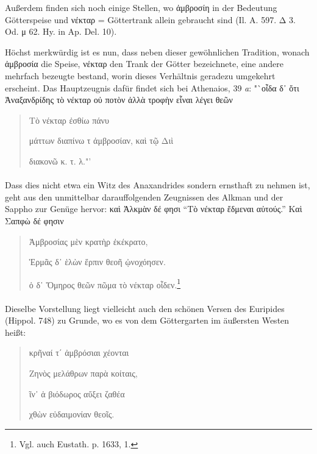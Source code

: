 \documentclass[a4paper, 11pt, oneside]{article}
\begin{document}
Außerdem finden sich noch einige Stellen, wo ἀμβροσίη in der Bedeutung Götterspeise und νέκταρ = Göttertrank allein gebraucht sind (Il. Α. 597. Δ 3. Od. μ 62. Hy. in Ap. Del. 10).

Höchst merkwürdig ist es nun, dass neben dieser gewöhnlichen Tradition, wonach ἀμβροσία die Speise, νέκταρ den Trank der Götter bezeichnete, eine andere mehrfach bezeugte bestand, worin dieses Verhältnis geradezu umgekehrt erscheint. Das Hauptzeugnis dafür findet sich bei Athenaios, 39 \emph{a}: "`οἶδα δ᾽ ὅτι Ἀναξανδρίδης τὸ νέκταρ οὐ ποτὸν ἀλλὰ τροφὴν εἶναι λέγει θεῶν
\begin{quotation}
\hspace*{15mm}Τὸ νέκταρ ἐσθίω πάνυ

μάττων διαπίνω τ ἀμβροσίαν, καὶ τῷ Διὶ

διακονῶ κ. τ. λ."'
\end{quotation}
\paragraph{}
Dass dies nicht etwa ein Witz des Anaxandrides sondern ernsthaft zu nehmen ist, geht aus den unmittelbar darauffolgenden Zeugnissen des Alkman und der Sappho zur Genüge hervor: καὶ Ἀλκμὰν δέ φησι "`Τὸ νέκταρ ἔδμεναι αὐτούς."' Καὶ Σαπφὼ δέ φησιν
\begin{quotation}
Ἀμβροσίας μὲν κρατὴρ ἐκέκρατο,

Ἑρμᾶς δ᾽ ἑλὼν ἕρπιν θεοῆ ᾠνοχόησεν.

ὁ δ᾽ Ὅμηρος θεῶν πῶμα τὸ νέκταρ οἶδεν.\footnote{Vgl. auch Eustath. p. 1633, 1.}
\end{quotation}
\paragraph{}
Dieselbe Vorstellung liegt vielleicht auch den schönen Versen des Euripides (Hippol. 748) zu Grunde, wo es von dem Göttergarten im äußersten Westen heißt:
\begin{quotation}
κρῆναί τ΄ ἀμβρόσιαι χέονται

Ζηνὸς μελάθρων παρὰ κοίταις,

ῖν᾽ ἁ βιόδωρος αὔξει ζαθέα

χθὼν εὐδαιμονίαν θεοῖς.
\end{quotation}
\end{document}
